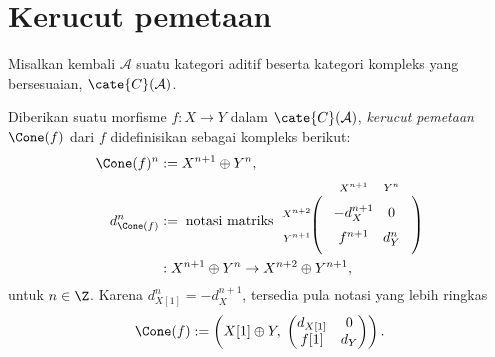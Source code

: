 
\section{Kerucut pemetaan}\label{sec:mapping-cone}
\hypertarget{o014.aljabr2.chapter3.mapping-cone}{ }
\enlargethispage{2pt}

Misalkan kembali $\mathcal{A}$ suatu kategori aditif beserta kategori kompleks
yang bersesuaian, $\cate{C}(\mathcal{A})$.

\begin{definisi}\label{def:Cone}
	Diberikan suatu morfisme $f:X\to Y$ dalam $\cate{C}(\mathcal{A})$,
	\emph{kerucut pemetaan} $\Cone(f)$ dari $f$ didefinisikan sebagai kompleks
	berikut:
	\begin{align*}
		\Cone(f)^n & := X^{n+1} \oplus Y^n, \\
		d^n_{\Cone(f)} & := \;\text{notasi matriks}\;
		\begin{tikzpicture}[baseline]
			\matrix (M) [matrix of math nodes, ampersand replacement=\&, left delimiter=(, right delimiter=)] {
					-d_X^{n+1} \& 0 \\
					f^{n+1} \& d_Y^n \\
				};
				\node[above=1.2em] at (M-1-1) {\scriptsize $X^{n+1}$};
				\node[above=1.2em] at (M-1-2) {\scriptsize $Y^n$};
				\node[left=2.7em] at (M-1-1) {\scriptsize $X^{n+2}$};
				\node[left=2.7em] at (M-2-1) {\scriptsize $Y^{n+1}$};
		\end{tikzpicture} \\
		& : X^{n+1} \oplus Y^n \to X^{n+2} \oplus Y^{n+1} ,
	\end{align*}
	untuk $n\in\Z$. Karena $d_{X[1]}^n=-d_X^{n+1}$, tersedia pula notasi
	yang lebih ringkas
	\[ \Cone(f) := \left( X[1] \oplus Y , \; \begin{pmatrix} d_{X[1]} & 0 \\ f[1] & d_Y \end{pmatrix} \right) . \]
\end{definisi}

